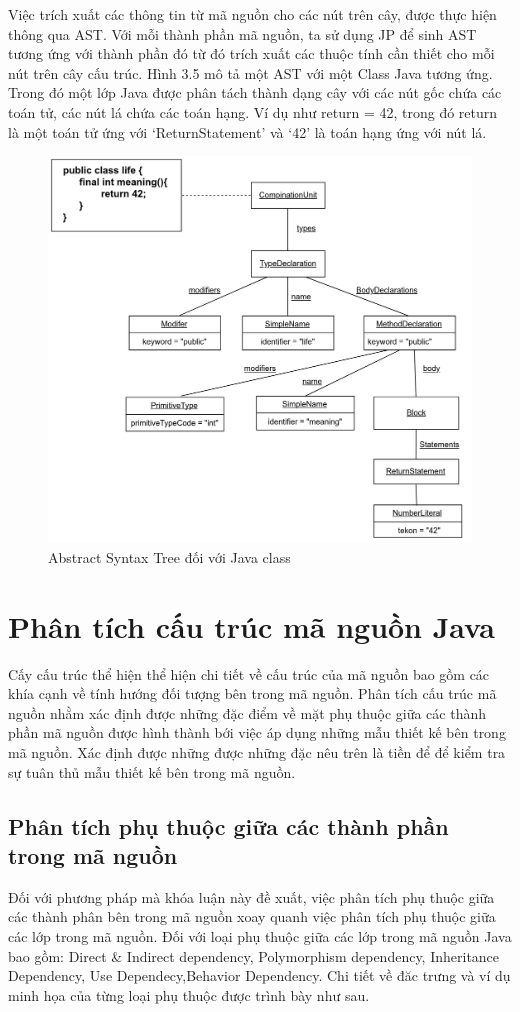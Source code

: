 \documentclass[12pt]{report}
\begin{document}
\noindent Việc trích xuất các thông tin từ mã nguồn cho các nút trên cây, được thực hiện thông qua AST. Với mỗi thành phần mã nguồn, ta sử dụng JP để sinh AST tương ứng với thành phần đó từ đó trích xuất các thuộc tính cần thiết cho mỗi nút trên cây cấu trúc.
Hình 3.5 mô tả một AST với một Class Java tương ứng. Trong đó một lớp Java được phân tách thành dạng cây với các nút gốc chứa các toán tử, các nút lá chứa các toán hạng. Ví dụ như return = 42, trong đó return là một toán tử ứng với `ReturnStatement' và `42' là toán hạng ứng với nút lá.
\begin{figure}[!htbp]
	\centering
	\includegraphics[scale=0.3]{images/ast}
	\caption{Abstract Syntax Tree đối với Java class}
	\label{fig:ast_for_java_class}
\end{figure}
\newpage
\section{Phân tích cấu trúc mã nguồn Java}
\indent Cấy cấu trúc thể hiện thể hiện chi tiết về cấu trúc của mã nguồn bao gồm các khía cạnh về tính hướng đối tượng bên trong mã nguồn. Phân tích cấu trúc mã nguồn nhằm xác định được những đặc điểm về mặt phụ thuộc giữa các thành phần mã nguồn được hình thành bới việc áp dụng những mẫu thiết kế bên trong mã nguồn. Xác định được những được những đặc nêu trên là tiền để để kiểm tra sự tuân thủ mẫu thiết kế bên trong mã nguồn.
\subsection{Phân tích phụ thuộc giữa các thành phần trong mã nguồn}
Đối với phương pháp mà khóa luận này đề xuất, việc phân tích phụ thuộc giữa các thành phân bên trong mã nguồn xoay quanh việc phân tích phụ thuộc giữa các lớp trong mã nguồn. Đối với loại phụ thuộc giữa các lớp trong mã nguồn Java bao gồm: Direct \& Indirect dependency, Polymorphism dependency, Inheritance Dependency, Use Dependecy,Behavior Dependency. Chi tiết về đăc trưng và ví dụ minh họa của từng loại phụ thuộc được trình bày như sau.
\end{document}
